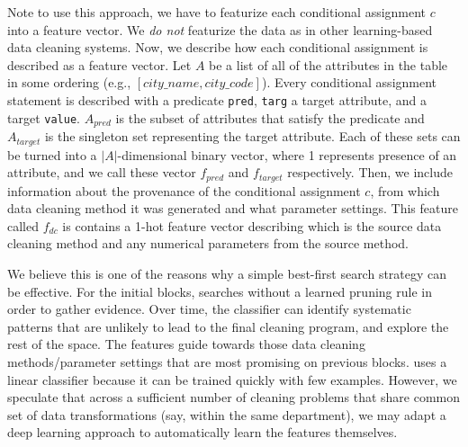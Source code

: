 Note to use this approach, we have to featurize each conditional assignment $c$ into a feature vector.
We \emph{do not} featurize the data as in other learning-based data cleaning systems.
Now, we describe how each conditional assignment is described as a feature vector.
Let $A$ be a list of all of the attributes in the table in some ordering (e.g., $[city\_name, city\_code]$).
Every conditional assignment statement is described with a predicate \texttt{pred}, \texttt{targ} a target attribute, and a target \texttt{value}. 
$A_{pred}$ is the subset of attributes that satisfy the predicate and $A_{target}$ is the singleton set representing the target attribute.
Each of these sets can be turned into a $|A|$-dimensional binary vector, where 1 represents presence of an attribute, and we call these vector $f_{pred}$ and $f_{target}$ respectively.
Then, we include information about the provenance of the conditional assignment $c$, from which data cleaning method it was generated and what parameter settings.
This feature called $f_{dc}$ is contains a 1-hot feature vector describing which is the source data cleaning method and any numerical parameters from the source method. 

We believe this is one of the reasons why a simple best-first search strategy can be effective.  For the initial blocks, \sys searches without a learned pruning rule in order to gather evidence.  Over time, the classifier can identify systematic patterns that are unlikely to lead to the final cleaning program, and explore the rest of the space.  
The features guide \sys towards those data cleaning methods/parameter settings that are most promising on previous blocks.
 \sys uses a linear classifier because it can be trained quickly with few examples.   However, we speculate that across a sufficient number of cleaning problems that share common set of data transformations (say, within the same department), we may adapt a deep learning approach to automatically learn the features themselves. 


\iffalse
\stitle{Faster Data Quality Refinement}
\ewu{I emphasize this assuming the experiment exists!!!}
One benefit of learning a pruning model for {\it data transformations} rather than relation instances is that it can potentially be reused or fine-tuned for new, but structurally similar, data cleaning problems.  For instance, when users iteratively refine the data quality measure, the problem is largely the same, and \sys can intialize the search with the previously learned model.  This has the potential to learn  {\it across data cleaning problems} rather than across blocks within a single problem.   \ewu{We evaluate the benefits of re-using models during iterative refinement in Section~\ref{XXX}.}
\fi



